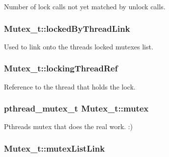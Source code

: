 Number of lock calls not yet matched by unlock calls. 

\subsubsection[{\texorpdfstring{locked\+By\+Thread\+Link}{lockedByThreadLink}}]{ Mutex\+\_\+t\+::locked\+By\+Thread\+Link}\hypertarget{struct_mutex__t_a8b39ff447f12c63325fd61aec937e0d3}{}\label{struct_mutex__t_a8b39ff447f12c63325fd61aec937e0d3}


Used to link onto the thread\textquotesingle{}s locked mutexes list. 

\subsubsection[{\texorpdfstring{locking\+Thread\+Ref}{lockingThreadRef}}]{ Mutex\+\_\+t\+::locking\+Thread\+Ref}\hypertarget{struct_mutex__t_a0a86d36c24fefa083cece91d74fa2ee1}{}\label{struct_mutex__t_a0a86d36c24fefa083cece91d74fa2ee1}


Reference to the thread that holds the lock. 

\subsubsection[{\texorpdfstring{mutex}{mutex}}]{\setlength{\rightskip}{0pt plus 5cm}pthread\+\_\+mutex\+\_\+t Mutex\+\_\+t\+::mutex}\hypertarget{struct_mutex__t_a4889ab228b7d5dfc2587f41bafa7b7f9}{}\label{struct_mutex__t_a4889ab228b7d5dfc2587f41bafa7b7f9}


Pthreads mutex that does the real work. \+:) 

\subsubsection[{\texorpdfstring{mutex\+List\+Link}{mutexListLink}}]{ Mutex\+\_\+t\+::mutex\+List\+Link}\hypertarget{struct_mutex__t_a62232078de9e32a980db7251688cc5e2}{}\label{struct_mutex__t_a62232078de9e32a980db7251688cc5e2}


